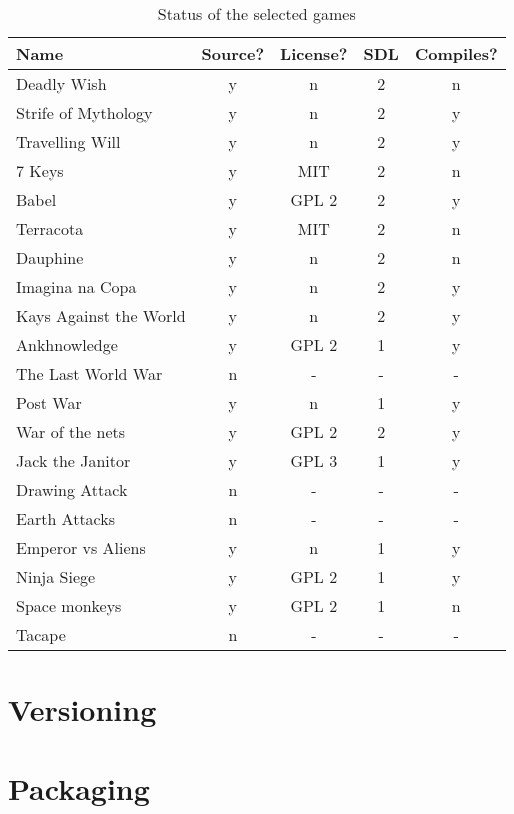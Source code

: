 \begin{table}[h!]
\centering
\caption{Status of the selected games}
\label{tab:first_games}
\begin{tabular}{|l|c|c|c|c|}
\hline
\textbf{Name} & \textbf{Source?} & \textbf{License?} & \textbf{SDL} & \textbf{Compiles?} \\ \hline
Deadly Wish & y & n & 2 & n \\ \hline
Strife of Mythology & y & n & 2 & y \\ \hline
Travelling Will & y & n & 2 & y \\ \hline
7 Keys & y & MIT & 2 & n \\ \hline
Babel & y & GPL 2 & 2 & y \\ \hline
Terracota & y & MIT & 2 & n \\ \hline
Dauphine & y & n & 2 & n \\ \hline
Imagina na Copa & y & n & 2 & y \\ \hline
Kays Against the World & y & n & 2 & y \\ \hline
Ankhnowledge & y & GPL 2 & 1 & y \\ \hline
The Last World War & n & - & - & - \\ \hline
Post War & y & n & 1 & y \\ \hline
War of the nets & y & GPL 2 & 2 & y \\ \hline
Jack the Janitor & y & GPL 3 & 1 & y \\ \hline
Drawing Attack & n & - & - & - \\ \hline
Earth Attacks & n & - & - & - \\ \hline
Emperor vs Aliens & y & n & 1 & y \\ \hline
Ninja Siege & y & GPL 2 & 1 & y \\ \hline
Space monkeys & y & GPL 2 & 1 & n \\ \hline
Tacape & n & - & - & - \\ \hline
\end{tabular}
\end{table}


\section[Versioning]{Versioning}


\section[Packaging]{Packaging}

